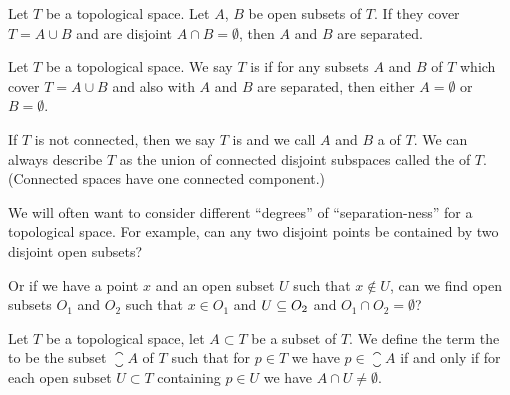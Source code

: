 \begin{theorem}
Let $T$ be a topological space.
Let $A$, $B$ be open subsets of $T$.
If they cover $T=A\cup B$ and are disjoint $A\cap B=\emptyset$,
then $A$ and $B$ are separated.
\end{theorem}

\begin{definition}
Let $T$ be a topological space.
We say $T$ is  if for any subsets $A$ and $B$ of $T$
which cover $T=A\cup B$ and also with $A$ and $B$ are separated, then
either $A=\emptyset$ or $B=\emptyset$.

If $T$ is not connected, then we say $T$ is  and
we call $A$ and $B$ a  of $T$. We can always
describe $T$ as the union of connected disjoint subspaces called the
 of $T$. (Connected spaces have one
connected component.)
\end{definition}

\begin{remark}[Separation]
We will often want to consider different ``degrees'' of
``separation-ness'' for a topological space. For example, can any two
disjoint points be contained by two disjoint open subsets?

Or if we have a point $x$ and an open subset $U$ such that $x\notin U$,
can we find open subsets $O_{1}$ and $O_{2}$ such that $x\in O_{1}$
and $U\propersubset O_{2}$ and $O_{1}\cap O_{2}=\emptyset$?
\end{remark}


\begin{definition}
Let $T$ be a topological space, let $A\subset T$ be a subset of $T$.
We define the term the  to be the subset
$\closure{A}$ of $T$ such that
for $p\in T$ we have $p\in\closure{A}$ if and only if for each open
subset $U\subset T$ containing $p\in U$ we have $A\cap U\neq\emptyset$.
\end{definition}

